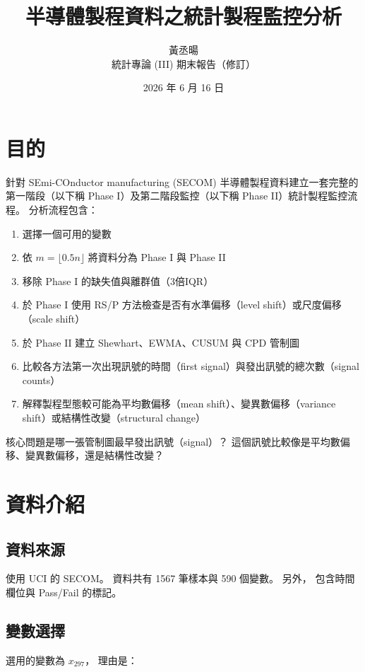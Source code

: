 \documentclass[a4paper, 12pt]{report}  %
\title{\textbf{半導體製程資料之統計製程監控分析}}
\author{黃丞暘 \quad 611211106\\統計專論 (III) 期末報告（修訂）}
\date{2026 年 6 月 16 日}
\begin{document}
\maketitle

\chapter{目的}

針對 SEmi-COnductor manufacturing (SECOM) 半導體製程資料建立一套完整的第一階段（以下稱 Phase I）及第二階段監控（以下稱 Phase II）統計製程監控流程。
分析流程包含：

\begin{enumerate}[label=(\arabic*)]
  \item 選擇一個可用的變數
  \item 依 \(m=\lfloor 0.5n \rfloor\) 將資料分為 Phase I 與 Phase II
  \item 移除 Phase I 的缺失值與離群值（3倍IQR）
  \item 於 Phase I 使用 RS/P 方法檢查是否有水準偏移（level shift）或尺度偏移（scale shift）
  \item 於 Phase II 建立 Shewhart、EWMA、CUSUM 與 CPD 管制圖
  \item 比較各方法第一次出現訊號的時間（first signal）與發出訊號的總次數（signal counts）
  \item 解釋製程型態較可能為平均數偏移（mean shift）、變異數偏移（variance shift）或結構性改變（structural change）
\end{enumerate}

核心問題是哪一張管制圖最早發出訊號（signal）？
這個訊號比較像是平均數偏移、變異數偏移，還是結構性改變？

\chapter{資料介紹}

\section*{資料來源}

使用 UCI 的 SECOM。
資料共有 1567 筆樣本與 590 個變數。
另外，
包含時間欄位與 Pass/Fail 的標記。

\section*{變數選擇}

選用的變數為 \(x_{297}\)，
理由是：
\end{document}
